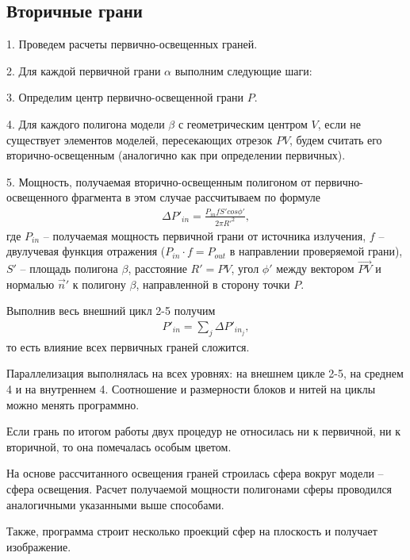 \subsection*{Вторичные грани}

1. Проведем расчеты первично-освещенных граней.

2. Для каждой первичной грани $\alpha$ выполним следующие шаги:

3. Определим центр первично-освещенной грани $P$.

4. Для каждого полигона модели $\beta$ с геометрическим центром $V$, если не существует элементов моделей, пересекающих отрезок $PV$, будем считать его вторично-освещенным (аналогично как при определении первичных).

5. Мощность, получаемая вторично-освещенным полигоном от первично-освещенного фрагмента в этом случае рассчитываем по формуле
\begin{gather}
  \Delta P'_{in} = \frac{P_{in} f S' cos\phi'}{2 \pi R'^2},
\end{gather}
где $ P_{in} $ -- получаемая мощность первичной грани от источника излучения, $ f $ -- двулучевая функция отражения ($ P_{in} \cdot f = P_{out} $ в направлении проверяемой грани), $ S' $ -- площадь полигона $ \beta $, расстояние $R' = PV$, угол $\phi'$ между вектором $\vec {PV}$ и нормалью $\vec n'$ к полигону $\beta$, направленной в сторону точки $P$.

Выполнив весь внешний цикл 2-5 получим 
\begin{gather}
  P'_{in} = \sum_j \Delta P'_{in_j},
\end{gather}
то есть влияние всех первичных граней сложится.

Параллелизация выполнялась на всех уровнях: на внешнем цикле 2-5, на среднем 4 и на внутреннем 4. Соотношение и размерности блоков и нитей на циклы можно менять программно. 

Если грань по итогом работы двух процедур не относилась ни к первичной, ни к вторичной, то она помечалась особым цветом. 

На основе рассчитанного освещения граней строилась сфера вокруг модели -- сфера освещения. Расчет получаемой мощности полигонами сферы проводился аналогичными указанными выше способами. 

Также, программа строит несколько проекций сфер на плоскость и получает изображение.
